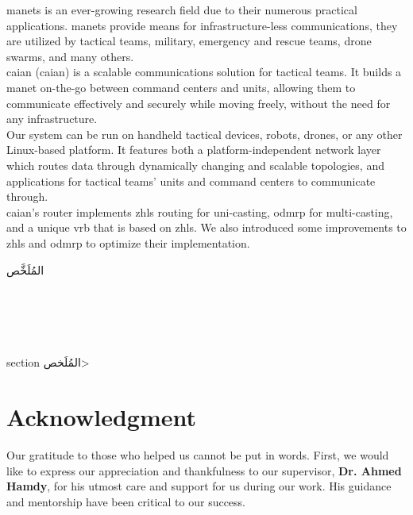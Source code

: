 \quad \acrfull{manets} is an ever-growing research field due to their numerous practical applications. \acrshort{manets} provide means for infrastructure-less communications, they are utilized by tactical teams, military, emergency and rescue teams, drone swarms, and many others. \\

\acrshort{caian} (\acrlong{caian}) is a scalable communications solution for tactical teams. It builds a \acrshort{manet} on-the-go between command centers and units, allowing them to communicate effectively and securely while moving freely, without the need for any infrastructure. \\

Our system can be run on handheld tactical devices, robots, drones, or any other Linux-based platform. It features both a platform-independent network layer which routes data through dynamically changing and scalable topologies, and applications for tactical teams’ units and command centers to communicate through. \\

\acrshort{caian}'s router implements \acrfull{zhls} routing for uni-casting, \acrfull{odmrp} for multi-casting, and a unique \acrfull{vrb} that is based on \acrshort{zhls}. We also introduced some improvements to \acrshort{zhls} and \acrshort{odmrp} to optimize their implementation.

\newpage

\begin{arabtext}
{\huge
المُلَخَّص
}\vspace{20pt}

\end{arabtext}
{\color{white} 
\tiny 
\section*{~} 
{section}
{\<المُلَخص>}
}
\newpage

\section*{Acknowledgment}
\quad Our gratitude to those who helped us cannot be put in words. First, we would like to express our appreciation and thankfulness to our supervisor, \textbf{Dr. Ahmed Hamdy}, for his utmost care and support for us during our work. His guidance and mentorship have been critical to our success. \\

